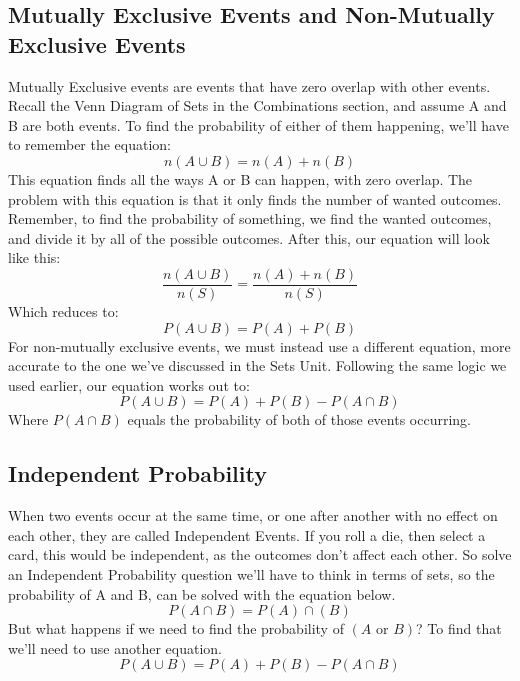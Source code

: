 \documentclass[final,1p,12pt]{elsarticle}
\begin{document}
    \subsection{Mutually Exclusive Events and Non-Mutually Exclusive Events}
    Mutually Exclusive events are events that have zero overlap with other events.
    Recall the Venn Diagram of Sets in the Combinations section, and assume A and B are both events.
    To find the probability of either of them happening, we'll have to remember the equation:
    \begin{equation*}
        n(A\cup B) = n(A) + n(B)
    \end{equation*}
    This equation finds all the ways A or B can happen, with zero overlap.
    The problem with this equation is that it only finds the number of wanted outcomes.
    Remember, to find the probability of something, we find the wanted outcomes, and divide it by all of the possible outcomes.
    After this, our equation will look like this:
    \begin{equation*}
        \frac{n(A \cup B)}{n(S)} = \frac{n(A) + n(B)}{n(S)}
    \end{equation*}
    Which reduces to:
    \begin{equation*}
        P(A\cup B) = P(A) + P(B)
    \end{equation*}
    For non-mutually exclusive events, we must instead use a different equation, more accurate to the one we've discussed in the Sets Unit.
    Following the same logic we used earlier, our equation works out to:
    \begin{equation*}
        P(A\cup B) = P(A) + P(B) - P(A\cap B)
    \end{equation*}
    Where $P(A\cap B)$ equals the probability of both of those events occurring.

    \subsection{Independent Probability}
    When two events occur at the same time, or one after another with no effect on each other, they are called Independent Events.
    If you roll a die, then select a card, this would be independent, as the outcomes don't affect each other.
    So solve an Independent Probability question we'll have to think in terms of sets, so the probability of A and B, can be solved with the equation below.
    \begin{equation*}
        P(A\cap B) = P(A) \cap(B)
    \end{equation*}
        But what happens if we need to find the probability of $(A \mbox{ or } B)$?
        To find that we'll need to use another equation.
    \begin{equation*}
        P(A\cup B) = P(A) + P(B) - P(A\cap B)
    \end{equation*}
    
\end{document}
